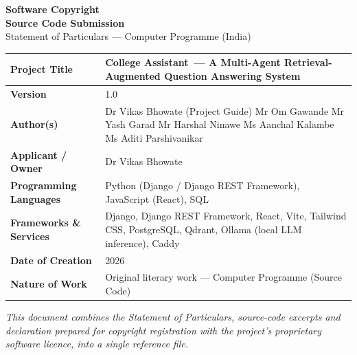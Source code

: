 \documentclass[11pt,a4paper]{article}
\newcommand{\OwnerName}{Dr Vikas Bhowate}
\newcommand{\SoftwareName}{College Assistant}
\newcommand{\SoftwareTagline}{A Multi-Agent Retrieval-Augmented Question Answering System}
\begin{document}
\begin{center}
    {\LARGE \bfseries Software Copyright}\\[0.3em]
    {\LARGE \bfseries Source Code Submission}\\[1em]
    {\large Statement of Particulars --- Computer Programme (India)}
\end{center}

\vspace{1.2em}

\renewcommand{\arraystretch}{1.5}
\begin{tabularx}{\linewidth}{|>{\bfseries}p{4cm}|X|}
\hline
Project Title & \SoftwareName\ --- \SoftwareTagline \\
\hline
Version & 1.0 \\
\hline
Author(s) &
Dr Vikas Bhowate (Project Guide) \newline
Mr Om Gawande \newline
Mr Yash Garad \newline
Mr Harshal Ninawe \newline
Ms Aanchal Kalambe \newline
Ms Aditi Parshivanikar \\
\hline
Applicant / Owner & \OwnerName \\
\hline
Programming Languages & Python (Django / Django REST Framework), JavaScript (React), SQL \\
\hline
Frameworks \& Services & Django, Django REST Framework, React, Vite, Tailwind CSS, PostgreSQL, Qdrant, Ollama (local LLM inference), Caddy \\
\hline
Date of Creation & 2026 \\
\hline
Nature of Work & Original literary work --- Computer Programme (Source Code) \\
\hline
\end{tabularx}

\vfill
\begin{center}
\small\itshape This document combines the Statement of Particulars, source-code
excerpts and declaration prepared for copyright registration with the
project's proprietary software licence, into a single reference file.
\end{center}

\newpage

\end{document}
